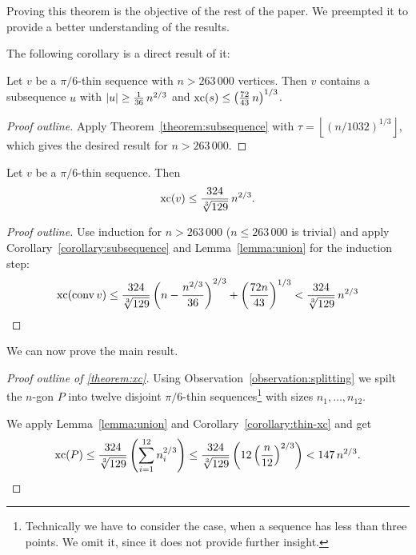 Proving this theorem is the objective of the rest of the paper. We preempted it to provide a better understanding of the results.

The following corollary is a direct result of it: 

\begin{corollary}\label{corollary:subsequence}
  Let $v$ be a $\pi/6$-thin sequence with $n > 263\,000$ vertices. 
  Then $v$ contains a subsequence $u$ with $\lvert u\rvert \geq \frac{1}{36}\,n^{2/3}$ and $\operatorname{xc}(s) \leq \left( \frac{72}{43}\,n \right)^{1/3}$.
\end{corollary}

\begin{proof}[Proof outline]
  Apply Theorem~\ref{theorem:subsequence} with $\tau=\left\lfloor (n/1032)^{1/3} \right\rfloor$, which gives the desired result for $n > 263\,000$.
\end{proof}

\begin{corollary}\label{corollary:thin-xc}
  Let $v$ be a $\pi/6$-thin sequence. Then $$\operatorname{xc}(v) \leq \frac{324}{\sqrt[3]{129}}\,n^{2/3} .$$
\end{corollary}

\begin{proof}[Proof outline]
  Use induction for $n > 263\,000$ ($n \leq 263\,000$ is trivial) and apply Corollary~\ref{corollary:subsequence} and Lemma~\ref{lemma:union} for the induction step: $$\operatorname{xc}(\operatorname{conv} v) \leq \frac{324}{\sqrt[3]{129}} \left(n-\frac{n^{2/3}}{36}\right)^{2/3}+\left(\frac{72n}{43}\right)^{1/3} < \frac{324}{\sqrt[3]{129}}\,n^{2/3}$$
\end{proof}

We can now prove the main result.

\begin{proof}[Proof outline of \ref{theorem:xc}]
  Using Observation~\ref{observation:splitting} we spilt the $n$-gon $P$ into twelve disjoint $\pi/6$-thin sequences\footnote{Technically we have to consider the case, when a sequence has less than three points. We omit it, since it does not provide further insight.} with sizes $n_1,\dots,n_{12}$.

  We apply Lemma~\ref{lemma:union} and Corollary~\ref{corollary:thin-xc} and get $$\operatorname{xc}(P)\leq\frac{324}{\sqrt[3]{129}}\left(\sum\limits_{i=1}^{12}n_i^{2/3}\right)\leq\frac{324}{\sqrt[3]{129}}\left(12\left(\frac{n}{12}\right)^{2/3}\right) < 147\,n^{2/3} .$$
\end{proof}



